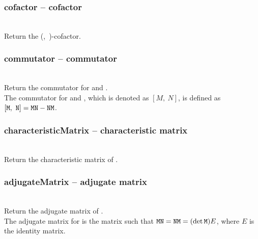   \subsubsection{cofactor -- cofactor}
   \\
   \spacing
   \quad Return the (,\ )-cofactor.\\
   \spacing
  \subsubsection{commutator -- commutator}
   \\
   \spacing
   \quad Return the commutator for  and .\\
   \spacing
   \quad The commutator for  and , which is denoted as $[M,\ N]$, is defined as $[\param{M},\ \param{N}]=\param{M}\param{N}-\param{N}\param{M}$. 
  \subsubsection{characteristicMatrix -- characteristic matrix}
   \\
   \spacing
   \quad Return the characteristic matrix of .\\
   \spacing
  \subsubsection{adjugateMatrix -- adjugate matrix}
   \\
   \spacing
   \quad Return the adjugate matrix of .\\
   \spacing
   \quad The adjugate matrix for  is the matrix  such that ${\texttt M}{\texttt N}={\texttt N}{\texttt M}=(\det{{\texttt M}})E$, where $E$ is the identity matrix.\\
